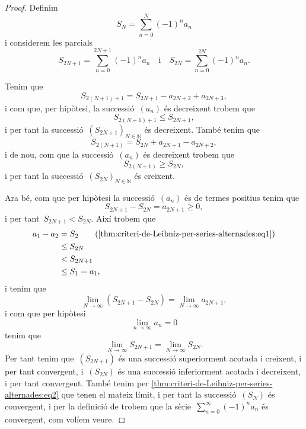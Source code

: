 \documentclass[../analisi-matematica.tex]{subfiles}
\begin{document}
    \begin{proof}
        Definim
        \begin{equation}
            \label{thm:criteri-de-Leibniz-per-series-alternades:eq1}
            S_{N}=\sum_{n=0}^{N}(-1)^{n}a_{n}
        \end{equation}
        i considerem les parcials
        \[
            S_{2N+1}=\sum_{n=0}^{2N+1}(-1)^{n}a_{n}\quad\text{i}\quad S_{2N}=\sum_{n=0}^{2N}(-1)^{n}a_{n}.
        \]

        Tenim que
        \[
            S_{2(N+1)+1}=S_{2N+1}-a_{2N+2}+a_{2N+3},
        \]
        i com que, per hipòtesi, la successió~\((a_{n})\) és decreixent trobem que
        \[
            S_{2(N+1)+1}\leq S_{2N+1},
        \]
        i per tant la successió~\((S_{2N+1})_{N\in\mathbb{N}}\) és decreixent.
        També tenim que
        \[
            S_{2(N+1)}=S_{2N}+a_{2N+1}-a_{2N+2},
        \]
        i de nou, com que la successió~\((a_{n})\) és decreixent trobem que
        \[
            S_{2(N+1)}\geq S_{2N},
        \]
        i per tant la successió~\((S_{2N})_{N\in\mathbb{N}}\) és creixent.

        Ara bé, com que per hipòtesi la successió~\((a_{n})\) és de termes positius tenim que
        \[
            S_{2N+1}-S_{2N}=a_{2N+1}\geq0,
        \]
        i per tant~\(S_{2N+1}<S_{2N}\).
        Així trobem que
        \begin{align*}
            a_{1}-a_{2}&=S_{2} \tag{\ref{thm:criteri-de-Leibniz-per-series-alternades:eq1}} \\
            &\leq S_{2N} \\
            &< S_{2N+1} \\
            &\leq S_{1}=a_{1},
        \end{align*}
        i tenim que
        \[
            \lim_{N\to\infty}\left(S_{2N+1}-S_{2N}\right)=\lim_{N\to\infty}a_{2N+1},
        \]
        i com que per hipòtesi
        \[
            \lim_{n\to\infty}a_{n}=0
        \]
        tenim que
        \begin{equation}
            \label{thm:criteri-de-Leibniz-per-series-alternades:eq2}
            \lim_{N\to\infty}S_{2N+1}=\lim_{N\to\infty}S_{2N}.
        \end{equation}
        Per tant tenim que~\((S_{2N+1})\) és una successió superiorment acotada i creixent, i per tant convergent, i~\((S_{2N})\) és una successió inferiorment acotada i decreixent, i per tant convergent.
        També tenim per \eqref{thm:criteri-de-Leibniz-per-series-alternades:eq2} que tenen el mateix límit, i per tant la successió~\((S_{N})\) és convergent, i per la definició de  trobem que la sèrie~\(\sum_{n=0}^{\infty}(-1)^{n}a_{n}\) és convergent, com volíem veure.
    \end{proof}
\end{document}

